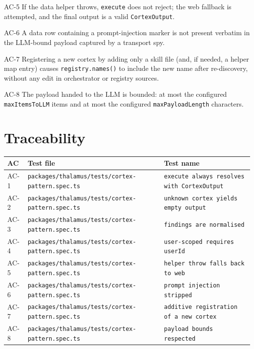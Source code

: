 \begin{ac}{AC-5}
If the data helper throws, \texttt{execute} does not reject; the web fallback is attempted, and the final output is a valid \texttt{CortexOutput}.
\end{ac}

\begin{ac}{AC-6}
A data row containing a prompt-injection marker is not present verbatim in the LLM-bound payload captured by a transport spy.
\end{ac}

\begin{ac}{AC-7}
Registering a new cortex by adding only a skill file (and, if needed, a helper map entry) causes \texttt{registry.names()} to include the new name after re-discovery, without any edit in orchestrator or registry sources.
\end{ac}

\begin{ac}{AC-8}
The payload handed to the LLM is bounded: at most the configured \texttt{maxItemsToLLM} items and at most the configured \texttt{maxPayloadLength} characters.
\end{ac}

\section{Traceability}

\begin{center}
\begin{tabular}{@{}lll@{}}
\toprule
AC & Test file & Test name \\
\midrule
AC-1 & \texttt{packages/thalamus/tests/cortex-pattern.spec.ts} & \texttt{execute always resolves with CortexOutput} \\
AC-2 & \texttt{packages/thalamus/tests/cortex-pattern.spec.ts} & \texttt{unknown cortex yields empty output} \\
AC-3 & \texttt{packages/thalamus/tests/cortex-pattern.spec.ts} & \texttt{findings are normalised} \\
AC-4 & \texttt{packages/thalamus/tests/cortex-pattern.spec.ts} & \texttt{user-scoped requires userId} \\
AC-5 & \texttt{packages/thalamus/tests/cortex-pattern.spec.ts} & \texttt{helper throw falls back to web} \\
AC-6 & \texttt{packages/thalamus/tests/cortex-pattern.spec.ts} & \texttt{prompt injection stripped} \\
AC-7 & \texttt{packages/thalamus/tests/cortex-pattern.spec.ts} & \texttt{additive registration of a new cortex} \\
AC-8 & \texttt{packages/thalamus/tests/cortex-pattern.spec.ts} & \texttt{payload bounds respected} \\
\bottomrule
\end{tabular}
\end{center}

